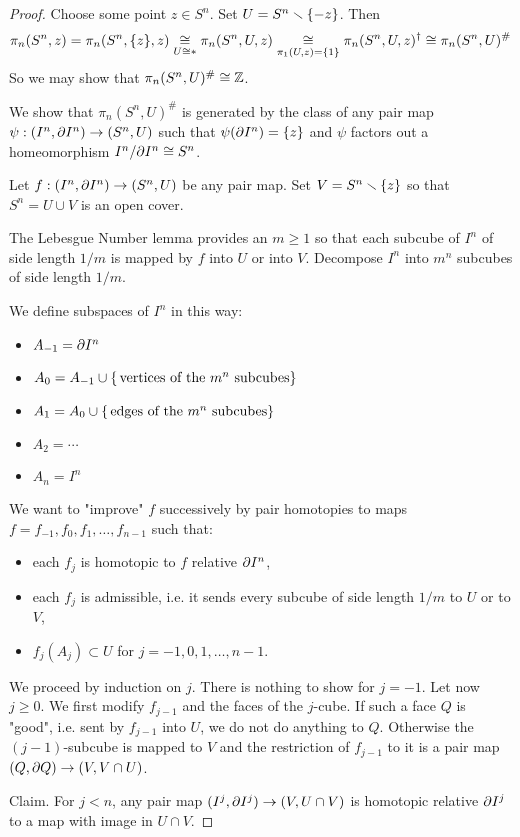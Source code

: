 \begin{proof}
Choose some point $z\in S^n$. Set $U=S^n\smallsetminus\{-z\}$. Then \[\pi_n(S^n,z)=\pi_n(S^n,\{z\},z)\underset{U\cong *}{\cong}\pi_n(S^n,U,z)\underset{\pi_1(U,z)=\{1\}}{\cong}\pi_n(S^n,U,z)^\dagger\cong\pi_n(S^n,U)^\#\]
So we may show that $\pi_n(S^n,U)^\#\cong{\mathbb Z}$.

We show that $\pi_n(S^n,U)^\#$ is generated by the class of any pair map $\psi:(I^n,\partial I^n)\to(S^n,U)$ such that $\psi(\partial I^n)=\{z\}$ and $\psi$ factors out a homeomorphism $I^n/\partial I^n\cong S^n$.

Let $f:(I^n,\partial I^n)\to(S^n,U)$ be any pair map. Set $V=S^n\smallsetminus\{z\}$ so that $S^n=U\cup V$ is an open cover.

The Lebesgue Number lemma provides an $m\geq1$ so that each subcube of $I^n$ of side length $1/m$ is mapped by $f$ into $U$ or into $V$. Decompose $I^n$ into $m^n$ subcubes of side length $1/m$.

We define subspaces of $I^n$ in this way:
\begin{itemize}[label=-]
    \item $A_{-1}=\partial I^n$
    \item $A_0=A_{-1}\cup\{\text{\,vertices of the }m^n\text{ subcubes}\}$
    \item $A_1=A_0\cup\{\text{\,edges of the }m^n\text{ subcubes}\}$
    \item $A_2=\cdots$
    \item $A_n=I^n$
\end{itemize}

We want to "improve" $f$ successively by pair homotopies to maps $f=f_{-1},f_0,f_1,\dots,f_{n-1}$ such that:
\begin{itemize}
    \item each $f_j$ is homotopic to $f$ relative $\partial I^n$,
    \item each $f_j$ is admissible, i.e. it sends every subcube of side length $1/m$ to $U$ or to $V$,
    \item $f_j(A_j)\subset U$ for $j=-1,0,1,\dots,n-1$.
\end{itemize}

We proceed by induction on $j$. There is nothing to show for $j=-1$. Let now $j\geq 0$. We first modify $f_{j-1}$ and the faces of the $j$-cube. If such a face $Q$ is "good", i.e. sent by $f_{j-1}$ into $U$, we do not do anything to $Q$. Otherwise the $(j-1)$-subcube is mapped to $V$ and the restriction of $f_{j-1}$ to it is a pair map $(Q,\partial Q)\to (V,V\cap U)$.

Claim. For $j<n$, any pair map $(I^j,\partial I^j)\to (V,U\cap V)$ is homotopic relative $\partial I^j$ to a map with image in $U\cap V$.


\end{proof}
